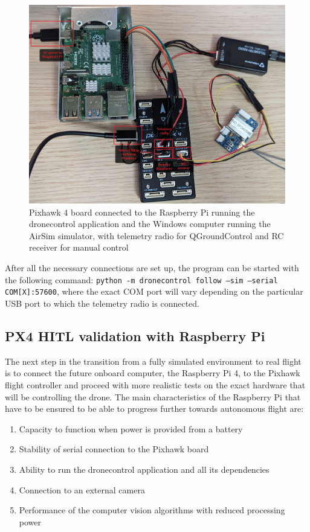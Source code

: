 \begin{figure}
  \centering
  \includegraphics[width=\textwidth, keepaspectratio]{img/hitl-setup-picture.jpg}
  \caption{Pixhawk 4 board connected to the Raspberry Pi running the dronecontrol application and the Windows computer running the AirSim simulator, with telemetry radio for QGroundControl and RC receiver for manual control}
  \label{fig:hitl-setup-picture}
\end{figure}

After all the necessary connections are set up, the program can be started with the following command:
\texttt{python -m dronecontrol follow --sim --serial COM[X]:57600}, where the exact COM port will vary depending on the particular USB port to which the telemetry radio is connected.


\subsection{PX4 HITL validation with Raspberry Pi}
\label{sec:test-5-rpi}


The next step in the transition from a fully simulated environment to real flight is to connect the future onboard computer, the Raspberry Pi 4, to the Pixhawk flight controller and proceed with more realistic tests on the exact hardware that will be controlling the drone.
The main characteristics of the Raspberry Pi that have to be ensured to be able to progress further towards autonomous flight are:
\begin{enumerate}
    \item Capacity to function when power is provided from a battery
    \item Stability of serial connection to the Pixhawk board
    \item Ability to run the dronecontrol application and all its dependencies
    \item Connection to an external camera
    \item Performance of the computer vision algorithms with reduced processing power
\end{enumerate}

